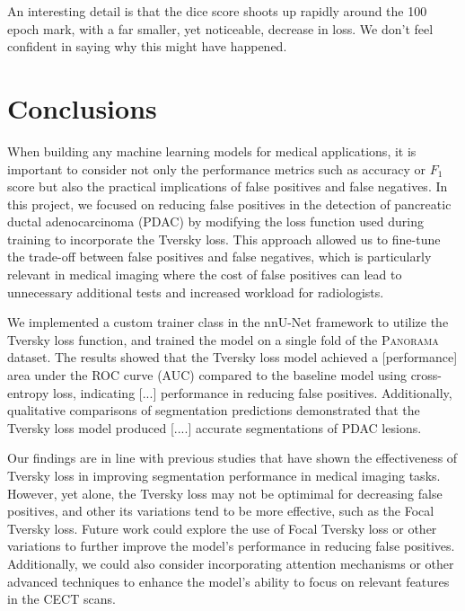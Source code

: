 \documentclass[conference]{IEEEtran}
\begin{document}
An interesting detail is that the dice score shoots up rapidly around the 100 epoch mark, with a far smaller, yet noticeable, decrease in loss. We don't feel confident in saying why this might have happened.

\section{Conclusions}
When building any machine learning models for medical applications, it is important to consider not only the performance metrics such as accuracy or $F_1$ score but also the practical implications of false positives and false negatives. In this project, we focused on reducing false positives in the detection of pancreatic ductal adenocarcinoma (PDAC) by modifying the loss function used during training to incorporate the Tversky loss. This approach allowed us to fine-tune the trade-off between false positives and false negatives, which is particularly relevant in medical imaging where the cost of false positives can lead to unnecessary additional tests and increased workload for radiologists.

We implemented a custom trainer class in the nnU-Net framework to utilize the Tversky loss function, and trained the model on a single fold of the \textsc{Panorama} dataset. The results showed that the Tversky loss model achieved a [performance] area under the ROC curve (AUC) compared to the baseline model using cross-entropy loss, indicating [...] performance in reducing false positives. Additionally, qualitative comparisons of segmentation predictions demonstrated that the Tversky loss model produced [....] accurate segmentations of PDAC lesions.

Our findings are in line with previous studies that have shown the effectiveness of Tversky loss in improving segmentation performance in medical imaging tasks. However, yet alone, the Tversky loss may not be optimimal for decreasing false positives, and other its variations tend to be more effective, such as the Focal Tversky loss\cite{b3}. Future work could explore the use of Focal Tversky loss or other variations to further improve the model's performance in reducing false positives. Additionally, we could also consider incorporating attention mechanisms or other advanced techniques to enhance the model's ability to focus on relevant features in the CECT scans.
\end{document}
